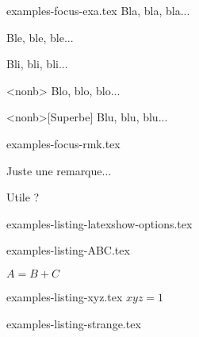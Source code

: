 \begin{filecontents*}[overwrite]{examples-focus-exa.tex}
Bla, bla, bla...

\begin{tdocexa}
    Ble, ble, ble...
\end{tdocexa}

\begin{tdocexa}[Magnifique]
    Bli, bli, bli...
\end{tdocexa}

\begin{tdocexa}<nonb>
    Blo, blo, blo...
\end{tdocexa}

\begin{tdocexa}<nonb>[Superbe]
    Blu, blu, blu...
\end{tdocexa}
\end{filecontents*}


\begin{filecontents*}[overwrite]{examples-focus-rmk.tex}
\begin{tdocrem}
    Juste une remarque...
\end{tdocrem}

\begin{tdocrem}
    Utile ?
\end{tdocrem}
\end{filecontents*}


\begin{filecontents*}[overwrite]{examples-listing-latexshow-options.tex}
\end{filecontents*}


\begin{filecontents*}[overwrite]{examples-listing-ABC.tex}
\begin{tdoclatex}[sbs]
    $A = B + C$
\end{tdoclatex}
\end{filecontents*}


\begin{filecontents*}[overwrite]{examples-listing-xyz.tex}
$x y z = 1$
\end{filecontents*}


\begin{filecontents*}[overwrite]{examples-listing-strange.tex}
\begin{tdoclatex}
\end{tdoclatex}
\end{filecontents*}



